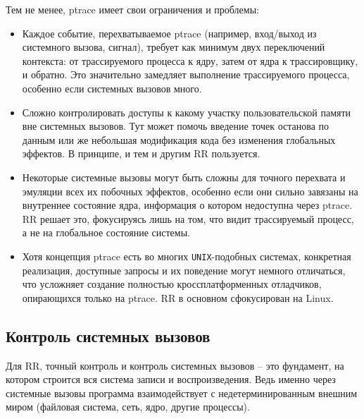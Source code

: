 Тем не менее, ptrace имеет свои ограничения и проблемы:

\begin{itemize}

  \item Каждое событие, перехватываемое ptrace (например, вход/выход из
  системного вызова, сигнал), требует как минимум двух переключений контекста:
  от трассируемого процесса к ядру, затем от ядра к трассировщику, и обратно.
  Это значительно замедляет выполнение трассируемого процесса, особенно если
  системных вызовов много.

  \item Сложно контролировать доступы к какому участку пользовательской памяти
  вне системных вызовов. Тут может помочь введение точек останова по данным или
  же небольшая модификация кода без изменения глобальных эффектов. В принципе,
  и тем и другим RR пользуется.

  \item Некоторые системные вызовы могут быть сложны для точного перехвата и
  эмуляции всех их побочных эффектов, особенно если они сильно завязаны на
  внутреннее состояние ядра, информация о котором недоступна через ptrace. RR
  решает это, фокусируясь лишь на том, что видит трассируемый процесс, а не на
  глобальное состояние системы.

  \item Хотя концепция ptrace есть во многих \texttt{UNIX}-подобных системах, конкретная
  реализация, доступные запросы и их поведение могут немного отличаться, что
  усложняет создание полностью кроссплатформенных отладчиков, опирающихся
  только на ptrace. RR в основном сфокусирован на Linux.

\end{itemize}

\subsection{Контроль системных вызовов}


Для RR, точный контроль и контроль системных вызовов – это фундамент,
на котором строится вся система записи и воспроизведения. Ведь именно через
системные вызовы программа взаимодействует с недетерминированным внешним миром
(файловая система, сеть, ядро, другие процессы).

